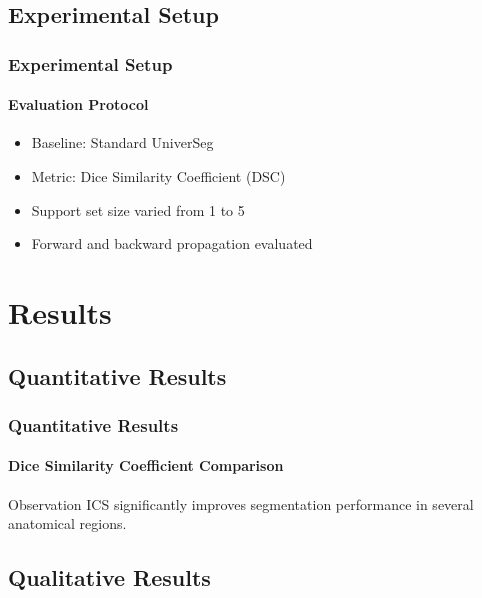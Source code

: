 \documentclass[nometaot,lecture,amberg,autotoc,toc=twocolumn,indicatelastpageofframe,footlinebox]{OTHAWbeamer}
\begin{document}
\subsection{Experimental Setup}

\begin{frame}
    \frametitle{Experimental Setup}
    \framesubtitle{Evaluation Protocol}

    \begin{itemize}
        \item Baseline: Standard UniverSeg
        \item Metric: Dice Similarity Coefficient (DSC)
        \item Support set size varied from 1 to 5
        \item Forward and backward propagation evaluated
    \end{itemize}

\end{frame}


\section{Results}

\subsection{Quantitative Results}

\begin{frame}
    \frametitle{Quantitative Results}
    \framesubtitle{Dice Similarity Coefficient Comparison}

    \centering


    \vspace{1em}

    \begin{block}{Observation}
        ICS significantly improves segmentation performance in several anatomical regions.
    \end{block}

\end{frame}

\subsection{Qualitative Results}
\end{document}
